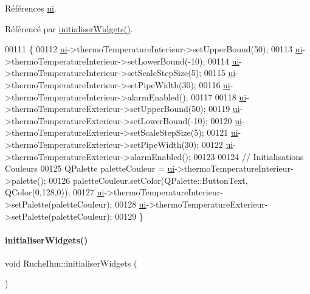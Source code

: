 Références \hyperlink{class_ruche_ihm_a64786058bd7f88ca2f1e9743bb27c25b}{ui}.



Référencé par \hyperlink{class_ruche_ihm_a98c493fcd2ef145a3d51ff84bbf8748e}{initialiser\+Widgets()}.


\begin{DoxyCode}
00111 \{
00112     \hyperlink{class_ruche_ihm_a64786058bd7f88ca2f1e9743bb27c25b}{ui}->thermoTemperatureInterieur->setUpperBound(50);
00113     \hyperlink{class_ruche_ihm_a64786058bd7f88ca2f1e9743bb27c25b}{ui}->thermoTemperatureInterieur->setLowerBound(-10);
00114     \hyperlink{class_ruche_ihm_a64786058bd7f88ca2f1e9743bb27c25b}{ui}->thermoTemperatureInterieur->setScaleStepSize(5);
00115     \hyperlink{class_ruche_ihm_a64786058bd7f88ca2f1e9743bb27c25b}{ui}->thermoTemperatureInterieur->setPipeWidth(30);
00116     \hyperlink{class_ruche_ihm_a64786058bd7f88ca2f1e9743bb27c25b}{ui}->thermoTemperatureInterieur->alarmEnabled();
00117 
00118     \hyperlink{class_ruche_ihm_a64786058bd7f88ca2f1e9743bb27c25b}{ui}->thermoTemperatureExterieur->setUpperBound(50);
00119     \hyperlink{class_ruche_ihm_a64786058bd7f88ca2f1e9743bb27c25b}{ui}->thermoTemperatureExterieur->setLowerBound(-10);
00120     \hyperlink{class_ruche_ihm_a64786058bd7f88ca2f1e9743bb27c25b}{ui}->thermoTemperatureExterieur->setScaleStepSize(5);
00121     \hyperlink{class_ruche_ihm_a64786058bd7f88ca2f1e9743bb27c25b}{ui}->thermoTemperatureExterieur->setPipeWidth(30);
00122     \hyperlink{class_ruche_ihm_a64786058bd7f88ca2f1e9743bb27c25b}{ui}->thermoTemperatureExterieur->alarmEnabled();
00123 
00124     \textcolor{comment}{// Initialisations Couleurs}
00125     QPalette paletteCouleur = \hyperlink{class_ruche_ihm_a64786058bd7f88ca2f1e9743bb27c25b}{ui}->thermoTemperatureInterieur->palette();
00126     paletteCouleur.setColor(QPalette::ButtonText, QColor(0,128,0));
00127     \hyperlink{class_ruche_ihm_a64786058bd7f88ca2f1e9743bb27c25b}{ui}->thermoTemperatureInterieur->setPalette(paletteCouleur);
00128     \hyperlink{class_ruche_ihm_a64786058bd7f88ca2f1e9743bb27c25b}{ui}->thermoTemperatureExterieur->setPalette(paletteCouleur);
00129 \}
\end{DoxyCode}
\mbox{\label{class_ruche_ihm_a98c493fcd2ef145a3d51ff84bbf8748e}} 
\paragraph{\texorpdfstring{initialiser\+Widgets()}{initialiserWidgets()}}
{\footnotesize\ttfamily void Ruche\+Ihm\+::initialiser\+Widgets (\begin{DoxyParamCaption}{ }\end{DoxyParamCaption})\hspace{0.3cm}{\ttfamily [private]}}



